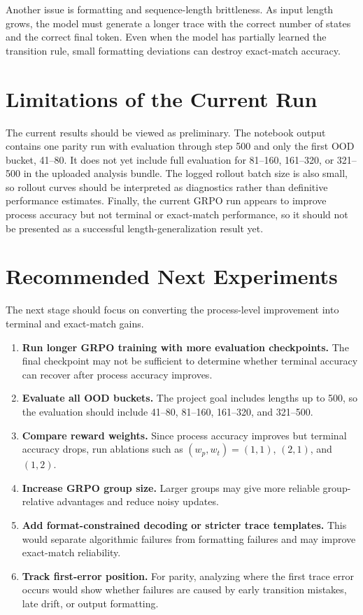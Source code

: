 \documentclass[11pt]{article}
\begin{document}
Another issue is formatting and sequence-length brittleness. As input length grows, the model must generate a longer trace with the correct number of states and the correct final token. Even when the model has partially learned the transition rule, small formatting deviations can destroy exact-match accuracy.

\section{Limitations of the Current Run}
The current results should be viewed as preliminary. The notebook output contains one parity run with evaluation through step 500 and only the first OOD bucket, 41--80. It does not yet include full evaluation for 81--160, 161--320, or 321--500 in the uploaded analysis bundle. The logged rollout batch size is also small, so rollout curves should be interpreted as diagnostics rather than definitive performance estimates. Finally, the current GRPO run appears to improve process accuracy but not terminal or exact-match performance, so it should not be presented as a successful length-generalization result yet.

\section{Recommended Next Experiments}
The next stage should focus on converting the process-level improvement into terminal and exact-match gains.
\begin{enumerate}[leftmargin=*]
  \item \textbf{Run longer GRPO training with more evaluation checkpoints.} The final checkpoint may not be sufficient to determine whether terminal accuracy can recover after process accuracy improves.
  \item \textbf{Evaluate all OOD buckets.} The project goal includes lengths up to 500, so the evaluation should include 41--80, 81--160, 161--320, and 321--500.
  \item \textbf{Compare reward weights.} Since process accuracy improves but terminal accuracy drops, run ablations such as $(w_p,w_t)=(1,1)$, $(2,1)$, and $(1,2)$.
  \item \textbf{Increase GRPO group size.} Larger groups may give more reliable group-relative advantages and reduce noisy updates.
  \item \textbf{Add format-constrained decoding or stricter trace templates.} This would separate algorithmic failures from formatting failures and may improve exact-match reliability.
  \item \textbf{Track first-error position.} For parity, analyzing where the first trace error occurs would show whether failures are caused by early transition mistakes, late drift, or output formatting.
\end{enumerate}
\end{document}

